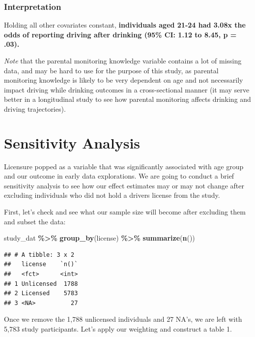 \documentclass[
]{article}
\newenvironment{Shaded}{\begin{snugshade}}{\end{snugshade}}
\newcommand{\FunctionTok}[1]{\textcolor[rgb]{0.13,0.29,0.53}{\textbf{#1}}}
\newcommand{\NormalTok}[1]{#1}
\newcommand{\SpecialCharTok}[1]{\textcolor[rgb]{0.81,0.36,0.00}{\textbf{#1}}}
\begin{document}
\subsubsection{Interpretation}\label{interpretation-3}

Holding all other covariates constant, \textbf{individuals aged 21-24
had 3.08x the odds of reporting driving after drinking (95\% CI: 1.12 to
8.45, p = .03).}

\emph{Note} that the parental monitoring knowledge variable contains a
lot of missing data, and may be hard to use for the purpose of this
study, as parental monitoring knowledge is likely to be very dependent
on age and not necessarily impact driving while drinking outcomes in a
cross-sectional manner (it may serve better in a longitudinal study to
see how parental monitoring affects drinking and driving trajectories).

\section{Sensitivity Analysis}\label{sensitivity-analysis}

Licensure popped as a variable that was significantly associated with
age group and our outcome in early data explorations. We are going to
conduct a brief sensitivity analysis to see how our effect estimates may
or may not change after excluding individuals who did not hold a drivers
license from the study.

First, let's check and see what our sample size will become after
excluding them and subset the data:

\begin{Shaded}
\begin{Highlighting}[]
\NormalTok{study\_dat }\SpecialCharTok{\%\textgreater{}\%} 
  \FunctionTok{group\_by}\NormalTok{(license) }\SpecialCharTok{\%\textgreater{}\%} 
  \FunctionTok{summarize}\NormalTok{(}\FunctionTok{n}\NormalTok{())}
\end{Highlighting}
\end{Shaded}

\begin{verbatim}
## # A tibble: 3 x 2
##   license    `n()`
##   <fct>      <int>
## 1 Unlicensed  1788
## 2 Licensed    5783
## 3 <NA>          27
\end{verbatim}

Once we remove the 1,788 unlicensed individuals and 27 NA's, we are left
with 5,783 study participants. Let's apply our weighting and construct a
table 1.
\end{document}
